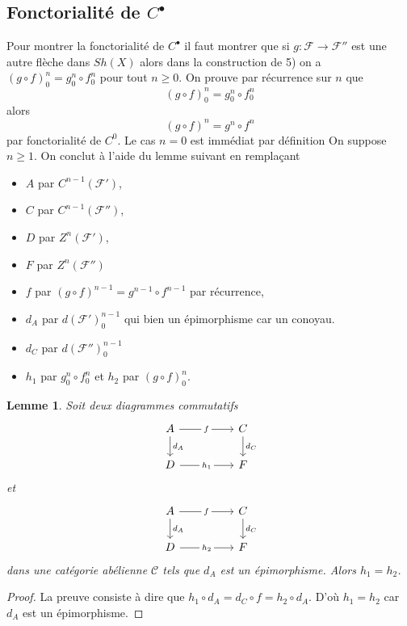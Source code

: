 \documentclass[a4paper,12pt]{article}
\newcommand{\Cat}{\mathcal{C}}
\newcommand{\F}{\mathscr F}
\theoremstyle{plain}
\newtheorem{lem}[subsection]{Lemme}
\theoremstyle{definition}
\theoremstyle{remark}
\begin{document}
\subsection{Fonctorialité de $C^\bullet$}
Pour montrer la fonctorialité de $C^\bullet$ il faut montrer que
si $g\colon \F\to \F''$ est une autre flèche dans $Sh(X)$ alors 
dans la construction de 5) on a $(g\circ f)_0^n=g_0^n\circ f_0^n$
pour tout $n\geq 0$. On prouve par récurrence sur $n$ que
\[(g\circ f)_0^n=g_0^n\circ f_0^n\]
alors 
\[(g\circ f)^n=g^n\circ f^n\]
par fonctorialité de $C^0$. Le cas $n=0$ est immédiat par définition
 On suppose $n\geq 1$.
On conclut à l'aide du lemme suivant en remplaçant 
\begin{itemize}
	\item $A$ par $C^{n-1}(\F')$,
	\item $C$ par $C^{n-1}(\F'')$,
	\item $D$ par $Z^n(\F')$,
	\item $F$ par $Z^n(\F'')$
	\item $f$ par $(g\circ f)^{n-1}=g^{n-1}\circ f^{n-1}$ par récurrence,
	\item $d_A$ par $d(\F')_0^{n-1}$ qui bien un épimorphisme
		car un conoyau.
	\item $d_C$ par $d(\F'')_0^{n-1}$
	\item $h_1$ par $g_0^n\circ f_0^n$ et $h_2$ par $(g\circ f)_0^n$.
\end{itemize}
\begin{lem}
	Soit deux diagrammes commutatifs 
\[\begin{tikzcd}
	A && C \\
	D && F
	\arrow["f"{description}, from=1-1, to=1-3]
	\arrow["{d_A}", from=1-1, to=2-1]
	\arrow["{d_C}", from=1-3, to=2-3]
	\arrow["{h_1}"{description}, from=2-1, to=2-3]
\end{tikzcd}\]
	et 
\[\begin{tikzcd}
	A && C \\
	D && F
	\arrow["f"{description}, from=1-1, to=1-3]
	\arrow["{d_A}", from=1-1, to=2-1]
	\arrow["{d_C}", from=1-3, to=2-3]
	\arrow["h_2"{description}, from=2-1, to=2-3]
\end{tikzcd}\]
	dans une catégorie abélienne $\Cat$ tels que $d_A$
	est un épimorphisme. Alors $h_1=h_2$.
\end{lem}
\begin{proof}
	La preuve consiste à dire que 
	$h_1\circ d_A=d_C\circ f=h_2\circ d_A$. D'où $h_1=h_2$ car
	$d_A$ est un épimorphisme.
\end{proof}
\end{document}
